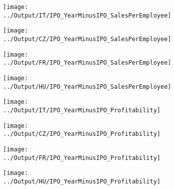 \documentclass[12pt,notitlepage]{article}
\begin{document}
\begin{figure}[htpb]
\centering
\caption{IPO and Sales per Employee}
\begin{subfigure}{.49\textwidth}
    \centering
 \texttt{[image: ../Output/IT/IPO\_YearMinusIPO\_SalesPerEmployee]}
\end{subfigure}%
\begin{subfigure}{.49\textwidth}
    \centering
 \texttt{[image: ../Output/CZ/IPO\_YearMinusIPO\_SalesPerEmployee]}
\end{subfigure}
\begin{subfigure}{.49\textwidth}
    \centering
 \texttt{[image: ../Output/FR/IPO\_YearMinusIPO\_SalesPerEmployee]}
\end{subfigure}%
\begin{subfigure}{.49\textwidth}
    \centering
 \texttt{[image: ../Output/HU/IPO\_YearMinusIPO\_SalesPerEmployee]}
\end{subfigure}
\end{figure}

\begin{figure}[htpb]
\centering
\caption{IPO and Profitability}
\begin{subfigure}{.49\textwidth}
    \centering
 \texttt{[image: ../Output/IT/IPO\_YearMinusIPO\_Profitability]}
\end{subfigure}%
\begin{subfigure}{.49\textwidth}
    \centering
 \texttt{[image: ../Output/CZ/IPO\_YearMinusIPO\_Profitability]}
\end{subfigure}
\begin{subfigure}{.49\textwidth}
    \centering
 \texttt{[image: ../Output/FR/IPO\_YearMinusIPO\_Profitability]}
\end{subfigure}%
\begin{subfigure}{.49\textwidth}
    \centering
 \texttt{[image: ../Output/HU/IPO\_YearMinusIPO\_Profitability]}
\end{subfigure}
\end{figure}
\end{document}
